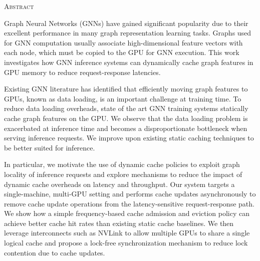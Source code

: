 \begin{center}
  \textsc{Abstract}
\end{center}
%
\noindent
%

Graph Neural Networks (GNNs) have gained significant popularity due to their excellent performance in many graph representation learning tasks. 
Graphs used for GNN computation usually associate high-dimensional feature vectors with each node, which must be copied to the GPU for GNN execution.
This work investigates how GNN inference systems can dynamically cache graph features in GPU memory to reduce request-response latencies.

Existing GNN literature has identified that efficiently moving graph features to GPUs, known as data loading, is an important challenge at training time. 
To reduce data loading overheads, state of the art GNN training systems statically cache graph features on the GPU.
We observe that the data loading problem is exacerbated at inference time and becomes a disproportionate bottleneck when serving inference requests. We improve upon existing static caching techniques to be better suited for inference. 

In particular, we motivate the use of dynamic cache policies to exploit graph locality of inference requests and explore mechanisms to reduce the impact of dynamic cache overheads on latency and throughput. 
Our system targets a single-machine, multi-GPU setting and performs cache updates asynchronously to remove cache update operations from the latency-sensitive request-response path.
We show how a simple frequency-based cache admission and eviction policy can achieve better cache hit rates than existing static cache baselines.
We then leverage interconnects such as NVLink to allow multiple GPUs to share a single logical cache and propose a lock-free synchronization mechanism to reduce lock contention due to cache updates. 